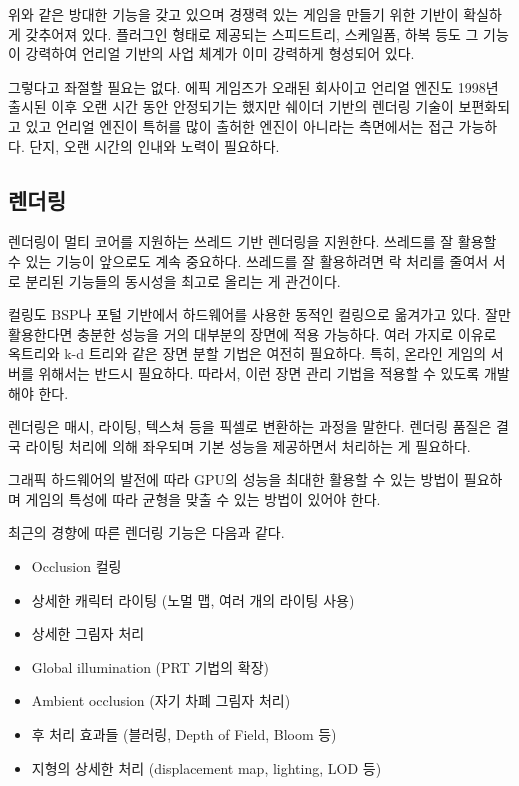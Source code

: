 \documentclass[chapter,kosection, 10.5pt, romanfixed, a4paper]{oblivoir}
\begin{document}
위와 같은 방대한 기능을 갖고 있으며 경쟁력 있는 게임을 만들기 위한 기반이 확실하게 갖추어져 있다. 
플러그인 형태로 제공되는 스피드트리, 스케일폼, 하복 등도 그 기능이 강력하여 언리얼 기반의 
사업 체계가 이미 강력하게 형성되어 있다. 

그렇다고 좌절할 필요는 없다. 에픽 게임즈가 오래된 회사이고 언리얼 엔진도 1998년 출시된 이후 
오랜 시간 동안 안정되기는 했지만 쉐이더 기반의 렌더링 기술이 보편화되고 있고 언리얼 엔진이 
특허를 많이 출허한 엔진이 아니라는 측면에서는 접근 가능하다. 단지, 오랜 시간의 인내와 
노력이 필요하다. 

\subsection{렌더링}

렌더링이 멀티 코어를 지원하는 쓰레드 기반 렌더링을 지원한다. 쓰레드를 잘 활용할 수 있는 
기능이 앞으로도 계속 중요하다. 쓰레드를 잘 활용하려면 락 처리를 줄여서 서로 분리된 
기능들의 동시성을 최고로 올리는 게 관건이다. 

컬링도 BSP나 포털 기반에서 하드웨어를 사용한 동적인 컬링으로 옮겨가고 있다. 
잘만 활용한다면 충분한 성능을 거의 대부분의 장면에 적용 가능하다. 여러 가지로 이유로 
옥트리와 k-d 트리와 같은 장면 분할 기법은 여전히 필요하다. 특히, 온라인 게임의 서버를
위해서는 반드시 필요하다. 따라서, 이런 장면 관리 기법을 적용할 수 있도록 개발해야 한다. 

렌더링은 매시, 라이팅, 텍스쳐 등을 픽셀로 변환하는 과정을 말한다. 렌더링 품질은 결국 라이팅 처리에
의해 좌우되며 기본 성능을 제공하면서 처리하는 게 필요하다. 

그래픽 하드웨어의 발전에 따라 GPU의 성능을 최대한 활용할 수 있는 방법이 필요하며 
게임의 특성에 따라 균형을 맞출 수 있는 방법이 있어야 한다. 

최근의 경향에 따른 렌더링 기능은 다음과 같다. 
\begin{itemize}
\item Occlusion 컬링
\item 상세한 캐릭터 라이팅 (노멀 맵, 여러 개의 라이팅 사용)
\item 상세한 그림자 처리 
\item Global illumination (PRT 기법의 확장)
\item Ambient occlusion (자기 차폐 그림자 처리)
\item 후 처리 효과들 (블러링, Depth of Field, Bloom 등)
\item 지형의 상세한 처리 (displacement map, lighting, LOD 등)
\end{itemize}
\end{document}
